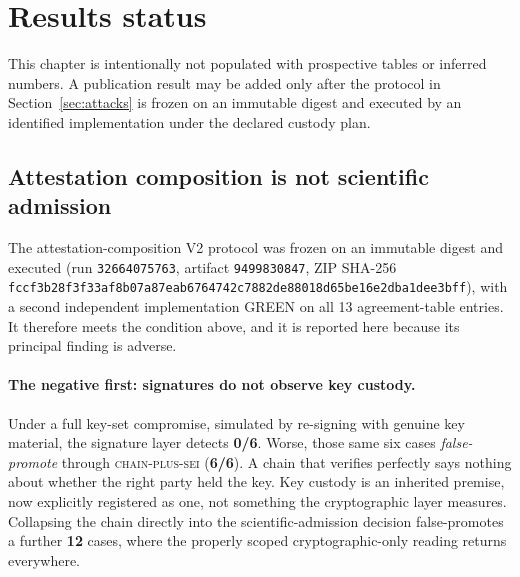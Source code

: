 \section{Results status}

\begin{center}
\end{center}

This chapter is intentionally not populated with prospective tables or inferred
numbers. A publication result may be added only after the protocol in
Section~\ref{sec:attacks} is frozen on an immutable digest and executed by an
identified implementation under the declared custody plan.

\subsection{Attestation composition is not scientific admission}
\label{sec:attestation-composition}

The attestation-composition V2 protocol was frozen on an immutable digest and
executed (run \texttt{32664075763}, artifact \texttt{9499830847}, ZIP SHA-256
\texttt{fccf3b28f3f33af8b07a87eab6764742c7882de88018d65be16e2dba1dee3bff}), with
a second independent implementation GREEN on all 13 agreement-table entries. It
therefore meets the condition above, and it is reported here because its
principal finding is adverse.

\paragraph{The negative first: signatures do not observe key custody.} Under a
full key-set compromise, simulated by re-signing with genuine key material, the
signature layer detects \textbf{0/6}. Worse, those same six cases
\emph{false-promote} through \textsc{chain-plus-sei} (\textbf{6/6}). A chain
that verifies perfectly says nothing about whether the right party held the key.
Key custody is an inherited premise, now explicitly registered as one, not
something the cryptographic layer measures. Collapsing the chain directly into
the scientific-admission decision false-promotes a further \textbf{12} cases,
where the properly scoped cryptographic-only reading returns \cannotcheck{}
everywhere.

